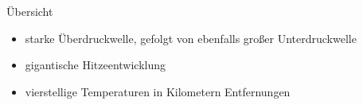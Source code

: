 \begin{frame}{Übersicht}
	\begin{itemize}
		\item starke Überdruckwelle, gefolgt von ebenfalls großer Unterdruckwelle
		\item gigantische Hitzeentwicklung
		\item vierstellige Temperaturen in Kilometern Entfernungen
	\end{itemize}
\end{frame}
